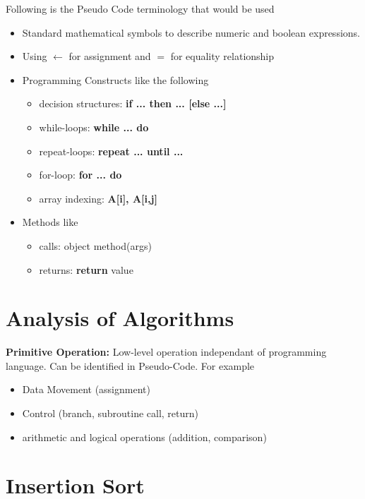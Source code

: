 	Following is the Pseudo Code terminology that would be used 
	\begin{itemize}
		\item Standard mathematical symbols to describe numeric and boolean expressions.
		\item Using $\gets$ for assignment and $=$ for equality relationship
		\item Programming Constructs like the following
		\begin{itemize}
			\item decision structures: \textbf{if ... then ... [else ...]}
			\item while-loops: \textbf{while ... do}
			\item repeat-loops: \textbf{repeat ... until ...}
			\item for-loop: \textbf{for ... do}
			\item array indexing: \textbf{A[i], A[i,j]}
		\end{itemize}
		\item Methods like
		\begin{itemize}
			\item calls: object method(args)
			\item returns: \textbf{return} value
		\end{itemize}
	\end{itemize}

	\section{Analysis of Algorithms}
	\textbf{Primitive Operation:} Low-level operation independant of programming language. Can be identified in Pseudo-Code. For example
	\begin{itemize}
		\item Data Movement (assignment)
		\item Control (branch, subroutine call, return)
		\item arithmetic and logical operations (addition, comparison)
	\end{itemize}
	\section{Insertion Sort}
	\begin{algorithm}[H]
		\label{alg:1}
	\end{algorithm}
